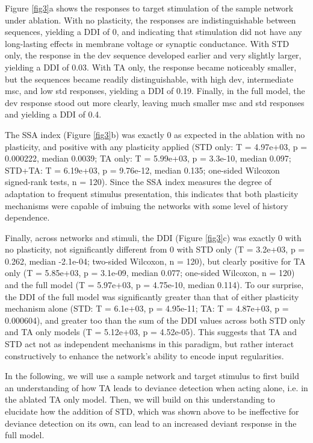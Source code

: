 \documentclass[pdflatex,referee,iicol,sn-basic]{sn-jnl}
\theoremstyle{thmstyleone}%
\theoremstyle{thmstyletwo}%
\theoremstyle{thmstylethree}%
\begin{document}
Figure \ref{fig3}a shows the responses to target stimulation of the sample network under ablation. With no plasticity, the responses are indistinguishable between sequences, yielding a DDI of 0, and indicating that stimulation did not have any long-lasting effects in membrane voltage or synaptic conductance. With STD only, the response in the dev sequence developed earlier and very slightly larger, yielding a DDI of 0.03. With TA only, the response became noticeably smaller, but the sequences became readily distinguishable, with high dev, intermediate msc, and low std responses, yielding a DDI of 0.19. Finally, in the full model, the dev response stood out more clearly, leaving much smaller msc and std responses and yielding a DDI of 0.4.

The SSA index (Figure \ref{fig3}b) was exactly 0 as expected in the ablation with no plasticity, and positive with any plasticity applied (STD only: T = 4.97e+03, p = 0.000222, median 0.0039; TA only: T = 5.99e+03, p = 3.3e-10, median 0.097; STD+TA: T = 6.19e+03, p = 9.76e-12, median 0.135; one-sided Wilcoxon signed-rank tests, n = 120). Since the SSA index measures the degree of adaptation to frequent stimulus presentation, this indicates that both plasticity mechanisms were capable of imbuing the networks with some level of history dependence.

Finally, across networks and stimuli, the DDI (Figure \ref{fig3}c) was exactly 0 with no plasticity, not significantly different from 0 with STD only (T = 3.2e+03, p = 0.262, median -2.1e-04; two-sided Wilcoxon, n = 120), but clearly positive for TA only (T = 5.85e+03, p = 3.1e-09, median 0.077; one-sided Wilcoxon, n = 120) and the full model (T = 5.97e+03, p = 4.75e-10, median 0.114). To our surprise, the DDI of the full model was significantly greater than that of either plasticity mechanism alone (STD: T = 6.1e+03, p = 4.95e-11; TA: T = 4.87e+03, p = 0.000604), and greater too than the sum of the DDI values across both STD only and TA only models (T = 5.12e+03, p = 4.52e-05). This suggests that TA and STD act not as independent mechanisms in this paradigm, but rather interact constructively to enhance the network's ability to encode input regularities.

In the following, we will use a sample network and target stimulus to first build an understanding of how TA leads to deviance detection when acting alone, i.e. in the ablated TA only model. Then, we will build on this understanding to elucidate how the addition of STD, which was shown above to be ineffective for deviance detection on its own, can lead to an increased deviant response in the full model.
\end{document}
